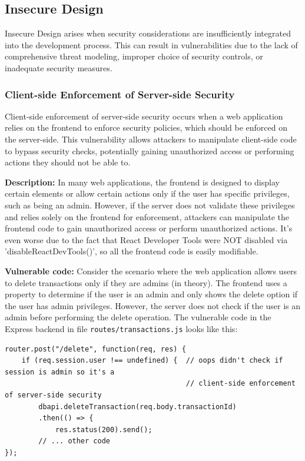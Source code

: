 \documentclass[]{article}
\begin{document}
\subsection{Insecure Design}

Insecure Design arises when security considerations are insufficiently integrated into the development process. This can result in vulnerabilities due to the lack of comprehensive threat modeling, improper choice of security controls, or inadequate security measures.

\subsubsection{Client-side Enforcement of Server-side Security}

Client-side enforcement of server-side security occurs when a web application relies on the frontend to enforce security policies, which should be enforced on the server-side. This vulnerability allows attackers to manipulate client-side code to bypass security checks, potentially gaining unauthorized access or performing actions they should not be able to.

\textbf{Description:}
In many web applications, the frontend is designed to display certain elements or allow certain actions only if the user has specific privileges, such as being an admin. However, if the server does not validate these privileges and relies solely on the frontend for enforcement, attackers can manipulate the frontend code to gain unauthorized access or perform unauthorized actions. It's even worse due to the fact that React Developer Tools were NOT disabled via 'disableReactDevTools()', so all the frontend code is easily modifiable.

\textbf{Vulnerable code:}
Consider the scenario where the web application allows users to delete transactions only if they are admins (in theory). The frontend uses a property to determine if the user is an admin and only shows the delete option if the user has admin privileges. However, the server does not check if the user is an admin before performing the delete operation. The vulnerable code in the Express backend in file \texttt{routes/transactions.js} looks like this:

\begin{lstlisting}
router.post("/delete", function(req, res) {
    if (req.session.user !== undefined) {  // oops didn't check if session is admin so it's a
                                           // client-side enforcement of server-side security
        dbapi.deleteTransaction(req.body.transactionId)
        .then(() => {
            res.status(200).send();
        // ... other code
});
\end{lstlisting}
\end{document}
